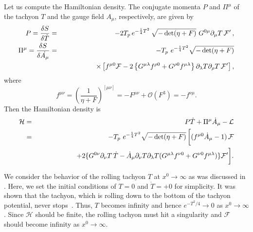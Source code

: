 \documentclass[12pt,a4paper]{article}
\newcommand{\p}{\partial}
\newcommand{\F}{\mathcal{F}}
\newcommand{\VT}{e^{-\frac{1}{4} T^2}}
\newcommand{\nn}{\nonumber\\}
\newcommand{\calO}{\mathcal{O}}
\begin{document}
Let us compute the Hamiltonian density.
The conjugate momenta $P$ and $\Pi^{\mu}$ of the tachyon $T$ and the
gauge field $A_\mu$, respectively,  are given by
\begin{eqnarray}
  P= \frac{\delta S}{\delta \dot{T}} &=& -2T_p\,\VT\,
	\sqrt{-\det(\eta+F)}~G^{0\mu}\p_\mu T\,\F'\,,\\
  \Pi^\mu = \frac{\delta S}{\delta \dot{A_\mu}}
  &=& -T_p\,\, \VT \sqrt{-\det(\eta +F)}\nn
  &&\hspace{11ex}
	\times\left[f^{\mu0}\F
	-2\left\{G^{\mu\lambda}f^{\rho0}
        +G^{\rho0}f^{\mu\lambda}\right\}
	\p_\lambda T \p_\rho T\, \F' \right] ,
\end{eqnarray}
where
\begin{equation}
  f^{\mu\nu}= \left(\frac{1}{\eta+F}\right)^{[\mu\nu]} =
	-F^{\mu\nu} + \calO(F^3)= -f^{\nu\mu}.\label{eq:f}
\end{equation}
Then the Hamiltonian density is
\begin{eqnarray}
 \mathcal{H}&=& P \dot{T} +\Pi^{\mu} \dot{A}_\mu -\mathcal{L} \nn
  &=& - T_p\,\, \VT \sqrt{-\det(\eta+F)}
	\,\bigg[ (f^{\mu0}\dot{A}_\mu - 1)\,\F \nn
  &&\hspace{13ex}+ 2\{ G^{0\nu}\p_\nu T\, \dot{T} - \dot{A}_\mu\p_\nu
	T\p_\lambda T(G^{\mu\lambda}f^{\nu0}
	+G^{\nu0}f^{\mu\lambda}) \} \F' \bigg].
\end{eqnarray}

We consider the behavior of the rolling tachyon $T$ at $x^0\to
\infty$ as was discussed in \cite{ST,Mi}.
Here, we set the initial conditions of $T=0$ and $\dot{T}=+0$ for
simplicity.
It was shown that the tachyon, which is rolling down to the bottom of
the tachyon potential, never stops~\cite{ST}.
Thus, $T$ becomes infinity and hence $e^{-T^2/4}\to 0$ as
$x^0\to\infty$.
Since $\mathcal{H}$ should be finite, the rolling
tachyon must hit a singularity and $\F$ should become infinity as
$x^0\to\infty$.
\end{document}
